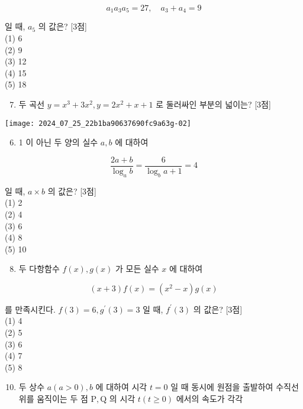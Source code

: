 \documentclass[10pt]{article}
\begin{document}
\[
a_{1} a_{3} a_{5}=27, \quad a_{3}+a_{4}=9
\]

일 때, $a_{5}$ 의 값은? [3점]\\
(1) 6\\
(2) 9\\
(3) 12\\
(4) 15\\
(5) 18

\begin{enumerate}
  \setcounter{enumi}{6}
  \item 두 곡선 $y=x^{3}+3 x^{2}, y=2 x^{2}+x+1$ 로 둘러싸인 부분의 넓이는? [3점]
\end{enumerate}

\begin{center}
\texttt{[image: 2024\_07\_25\_22b1ba90637690fc9a63g-02]}
\end{center}

\begin{enumerate}
  \setcounter{enumi}{5}
  \item 1 이 아닌 두 양의 실수 $a, b$ 에 대하여
\end{enumerate}

\[
\frac{2 a+b}{\log _{a} b}=\frac{6}{\log _{b} a+1}=4
\]

일 때, $a \times b$ 의 값은? [3점]\\
(1) 2\\
(2) 4\\
(3) 6\\
(4) 8\\
(5) 10

\begin{enumerate}
  \setcounter{enumi}{7}
  \item 두 다항함수 $f(x), g(x)$ 가 모든 실수 $x$ 에 대하여
\end{enumerate}

\[
(x+3) f(x)=\left(x^{2}-x\right) g(x)
\]

를 만족시킨다. $f(3)=6, g^{\prime}(3)=3$ 일 때, $f^{\prime}(3)$ 의 값은? [3점]\\
(1) 4\\
(2) 5\\
(3) 6\\
(4) 7\\
(5) 8

\begin{enumerate}
  \setcounter{enumi}{9}
  \item 두 상수 $a(a>0), b$ 에 대하여 시각 $t=0$ 일 때 동시에 원점을 출발하여 수직선 위를 움직이는 두 점 $\mathrm{P}, \mathrm{Q}$ 의 시각 $t(t \geq 0)$ 에서의 속도가 각각
\end{enumerate}
\end{document}
